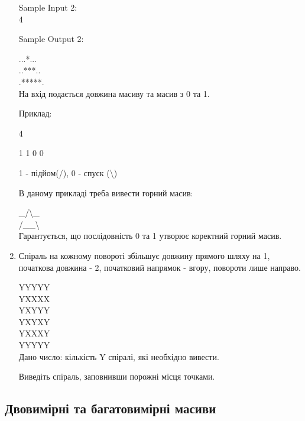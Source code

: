 \documentclass[]{article}
\begin{document}
\begin{enumerate}
Sample Input 2:\\

4

Sample Output 2:

...*...\\
..***..\\
.*****.\\


На вхід подається довжина масиву та масив з 0 та 1.

Приклад:

4

1 1 0 0

1  - підйом(\slash), 0 - спуск (\textbackslash)

В даному прикладі треба вивести горний масив:

\_\slash \textbackslash\_ \\
\slash\_\_\textbackslash\\

Гарантується, що послідовність 0 та 1 утворює коректний горний масив.
\item
Спіраль на кожному повороті збільшує довжину прямого шляху на 1, початкова довжина - 2,
початковий напрямок - вгору, повороти лише направо.

YYYYY\\
YXXXX\\
YXYYY\\
YXYXY\\
YXXXY\\
YYYYY\\
Дано число: кількість Y спіралі, які необхідно вивести.

Виведіть спіраль, заповнивши порожні місця точками.



\end{enumerate}

\subsection{Двовимірні та багатовимірні масиви}
\end{document}

